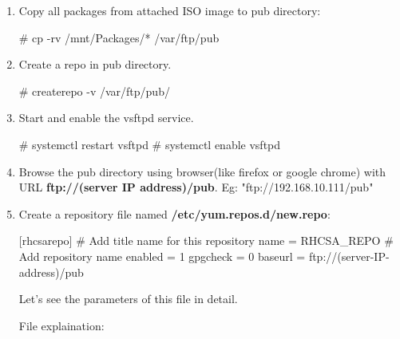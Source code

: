 \begin{flushleft}
\begin{enumerate}
		\bigskip
		\item Copy all packages from attached ISO image to pub directory:
		\begin{tcolorbox}[breakable,notitle,boxrule=-0pt,colback=black,colframe=black]
			\color{green}
			\font=9pt
			\# cp	-rv	/mnt/Packages/*	/var/ftp/pub
			\font=4pt
		\end{tcolorbox}
		
		\bigskip
		\item Create a repo in pub directory.
		\begin{tcolorbox}[breakable,notitle,boxrule=-0pt,colback=black,colframe=black]
			\color{green}
			\font=9pt
			\# createrepo	-v	/var/ftp/pub/
			\font=4pt
		\end{tcolorbox}

		\bigskip
		\item Start and enable the vsftpd service.
		\begin{tcolorbox}[breakable,notitle,boxrule=-0pt,colback=black,colframe=black]
			\color{green}
			\font=9pt
			\# systemctl   restart   vsftpd
			\newline
			\# systemctl   enable    vsftpd
			\font=4pt
		\end{tcolorbox}

		\bigskip
		\item Browse the pub directory using browser(like firefox or google chrome) with URL \textbf{ftp://(server IP address)/pub}.
		\newline
		Eg: "ftp://192.168.10.111/pub"

		\bigskip
		\item Create a repository file named \textbf{/etc/yum.repos.d/new.repo}:
		\begin{tcolorbox}[breakable,notitle,boxrule=-0pt,colback=black,colframe=black]
			\color{white}
			\font=9pt
			[rhcsarepo] \color{yellow}  \# Add title name for this repository 
			\newline
			\color{white}
			name = RHCSA\_REPO
			\color{yellow}
			  \# Add repository name
			\newline
			\color{white}
			enabled = 1
			\newline
			gpgcheck = 0
			\newline
			baseurl = ftp://(server-IP-address)/pub
			\font=4pt
		\end{tcolorbox}
		\bigskip
		Let's see the parameters of this file in detail.
		
		\newpage
		File explaination:
		

\end{enumerate}
\end{flushleft}
